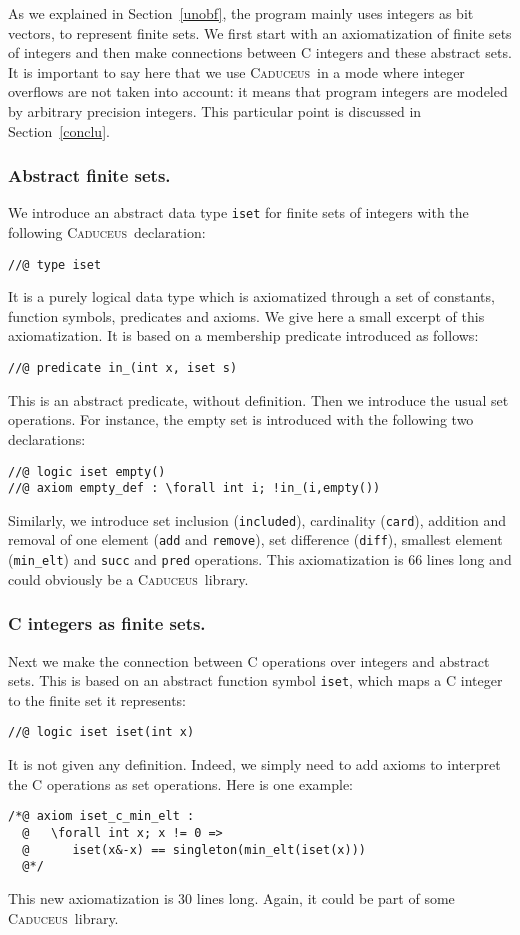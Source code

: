 \documentclass[a4paper]{llncs}
\newcommand{\caduceus}{\textsc{Caduceus}}
\begin{document}
As we explained in Section~\ref{unobf}, the program mainly uses integers
as bit vectors, to represent finite sets.  We first start with an
axiomatization of finite sets of integers and then make connections
between C integers and these abstract sets. It is important to say
here that we use \caduceus\ in a mode where integer overflows are not
taken into account: it means that program integers are modeled by arbitrary
precision integers. This particular point is discussed in
Section~\ref{conclu}. 

\subsubsection{Abstract finite sets.}
We introduce an abstract data type \texttt{iset} for finite sets of
integers with the following \caduceus\ declaration:
\begin{verbatim}
//@ type iset
\end{verbatim}
It is a purely logical data type which is axiomatized through a set of
constants, function symbols, predicates and axioms. We give here a small 
excerpt of this axiomatization. It is based on a
membership predicate  introduced as follows:
\begin{verbatim}
//@ predicate in_(int x, iset s)
\end{verbatim}
This is an abstract predicate, without definition. Then we introduce
the usual set operations. For instance, the empty set is introduced
with the following two declarations:
\begin{verbatim}
//@ logic iset empty()
//@ axiom empty_def : \forall int i; !in_(i,empty())
\end{verbatim}
Similarly, we introduce set inclusion (\texttt{included}), cardinality
(\texttt{card}), addition and removal
of one element (\texttt{add} and 
\texttt{remove}), set difference (\texttt{diff}), smallest element
(\texttt{min\_elt}) and \texttt{succ} and \texttt{pred} operations.
This axiomatization is 66 lines long and could obviously be a 
\caduceus\ library.

\subsubsection{C integers as finite sets.}
Next we make the connection between C operations over integers and
abstract sets. This is based on an abstract function symbol
\texttt{iset}, which maps a C integer to the finite set it represents:
\begin{verbatim}
//@ logic iset iset(int x)
\end{verbatim}
It is not given any definition. Indeed, we simply need to 
add axioms to interpret the C operations as set operations.
Here is one example:
\begin{verbatim}
/*@ axiom iset_c_min_elt :
  @   \forall int x; x != 0 =>
  @      iset(x&-x) == singleton(min_elt(iset(x)))
  @*/
\end{verbatim}
This new axiomatization is 30 lines long. Again, it could be part of some
\caduceus\ library.
\end{document}
